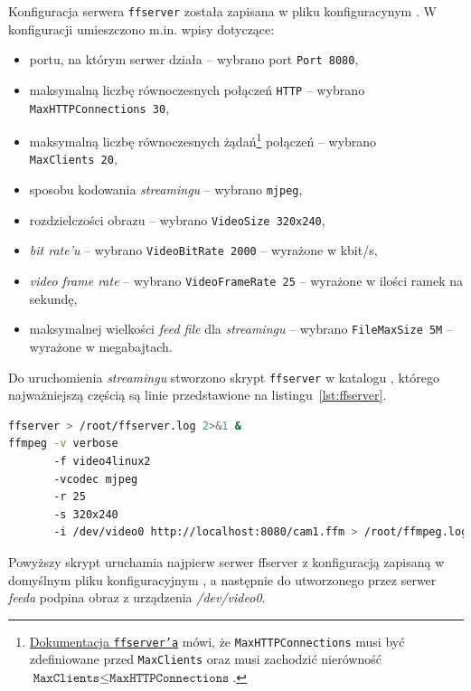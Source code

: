 \documentclass{article}
\begin{document}
Konfiguracja serwera \texttt{ffserver} została zapisana w pliku konfiguracynym . W konfiguracji umieszczono m.in. wpisy dotyczące:
\begin{itemize}
	\item portu, na którym serwer działa -- wybrano port \texttt{Port~8080},
	\item maksymalną liczbę równoczesnych połączeń \texttt{HTTP} -- wybrano \texttt{MaxHTTPConnections~30},
	\item maksymalną liczbę równoczesnych żądań\footnote{\href{https://www.ffmpeg.org/ffserver.html}{Dokumentacja \texttt{ffserver'a}} mówi, że \texttt{MaxHTTPConnections} musi być zdefiniowane przed \texttt{MaxClients} oraz musi zachodzić nierówność $\texttt{MaxClients}\leq\texttt{MaxHTTPConnections}$.} połączeń -- wybrano \texttt{MaxClients~20},
	\item sposobu kodowania \emph{streamingu} -- wybrano \texttt{mjpeg},
	\item rozdzielczości obrazu -- wybrano \texttt{VideoSize~320x240},
	\item \emph{bit rate'u} -- wybrano \texttt{VideoBitRate~2000} -- wyrażone w kbit/s,
	\item \emph{video frame rate} -- wybrano \texttt{VideoFrameRate 25} -- wyrażone w ilości ramek na sekundę,
	\item maksymalnej wielkości \emph{feed file} dla \emph{streamingu} -- wybrano \texttt{FileMaxSize~5M} -- wyrażone w megabajtach.
\end{itemize}

Do uruchomienia \emph{streamingu} stworzono skrypt \texttt{ffserver} w katalogu , którego najważniejszą częścią są linie przedstawione na listingu~\ref{lst:ffserver}.
\begin{lstlisting}[caption={Zawartość pliku \texttt{/etc/init.d/ffserver}},label=lst:ffserver,language=bash,frame=single,breaklines,captionpos=b]
ffserver > /root/ffserver.log 2>&1 &
ffmpeg -v verbose
       -f video4linux2
       -vcodec mjpeg
       -r 25
       -s 320x240
       -i /dev/video0 http://localhost:8080/cam1.ffm > /root/ffmpeg.log 2>&1 &
\end{lstlisting}
Powyższy skrypt uruchamia najpierw serwer ffserver z konfiguracją zapisaną w domyślnym pliku konfiguracyjnym , a następnie do utworzonego przez serwer \emph{feeda} podpina obraz z urządzenia \emph{/dev/video0}.

\end{document}
